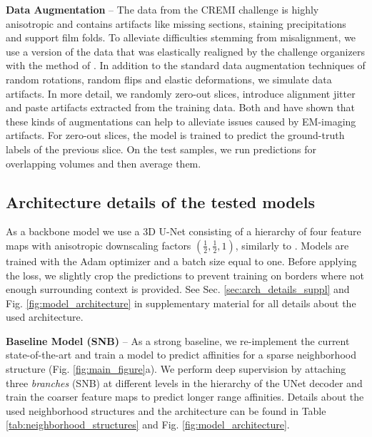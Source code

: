 \textbf{Data Augmentation} -- The data from the CREMI challenge is highly \linebreak anisotropic and contains artifacts like missing sections, staining precipitations and support film folds. 
To alleviate difficulties stemming from misalignment, we use a version of the data that was elastically realigned by the challenge organizers with the method of \cite{saalfeld2012elastic}.
In addition to the standard data augmentation techniques of random rotations, random flips and  elastic deformations, we simulate data artifacts.
In more detail, we randomly zero-out slices, introduce alignment jitter and paste artifacts extracted from the training data. Both \cite{funke2018large} and \cite{lee2017superhuman} have shown
that these kinds of augmentations can help to alleviate issues caused by EM-imaging artifacts. For zero-out slices, the model is trained to predict the ground-truth labels of the previous slice.
On the test samples, we run predictions for overlapping volumes and then average them.


 
 


\subsection{Architecture details of the tested models}\label{sec:models_details}
As a backbone model we use a 3D U-Net consisting of a hierarchy of four feature maps with anisotropic downscaling factors $(\frac{1}{2},\frac{1}{2},1)$, similarly to \cite{lee2019learning,lee2017superhuman,wolf2018mutex}. 
Models are trained with the Adam optimizer and a batch size equal to one. Before applying the loss, we slightly crop the predictions to prevent training on borders where not enough surrounding context is provided. 
See Sec. \ref{sec:arch_details_suppl} and Fig. \ref{fig:model_architecture} in supplementary material for all details about the used architecture. 

 
\textbf{Baseline Model (SNB)} -- As a strong baseline, we re-implement the current state-of-the-art and train a model to predict affinities for a sparse neighborhood structure (Fig. \ref{fig:main_figure}a). We perform deep supervision by attaching three \emph{\sparseBr branches} (SNB) at different levels in the hierarchy of the UNet decoder and train the coarser feature maps to predict longer range affinities. Details about the used neighborhood structures and the architecture can be found in Table \ref{tab:neighborhood_structures} and Fig. \ref{fig:model_architecture}.

